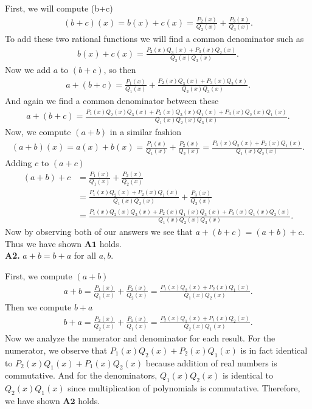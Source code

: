 \documentclass [10pt]{article}
\begin{document}
\begin{enumerate}
\begin{enumerate}
{First, we will compute (b+c) 
\begin{align*}
    (b+c)(x) = b(x) + c(x) = \frac{P_2(x)}{Q_2(x)} + \frac{P_3(x)}{Q_3(x)}.
\end{align*}
To add these two rational functions we will find a common denominator such as 
\begin{align*}
    b(x) + c(x) = \frac{P_2(x) Q_3(x) + P_3(x) Q_2(x)}{Q_2(x) Q_3(x)}.
\end{align*}
Now we add $a$ to $(b + c)$, so then
\begin{align*}
    a + (b+c) = \frac{P_1(x)}{Q_1(x)} + \frac{P_2(x) Q_3(x) + P_3(x) Q_2(x)}{Q_2(x) Q_3(x)}.
\end{align*}
And again we find a common denominator between these 
\begin{align*}
    a+(b+c) = \frac{P_1(x) Q_2(x) Q_3(x) + P_2(x) Q_3(x) Q_1(x) + P_3(x) Q_2(x) Q_1(x)}{ Q_1(x) Q_2(x) Q_3(x)}.
\end{align*}
Now, we compute $(a+b)$ in a similar fashion 
\begin{align*}
    (a+b)(x) = a(x) + b(x) = \frac{P_1(x)}{Q_1(x)} + \frac{P_2(x)}{Q_2(x)} = \frac{P_1(x) Q_2(x) + P_2(x) Q_1(x)}{Q_1(x) Q_2(x)}.
\end{align*}
Adding $c$ to $(a+c)$ 
\begin{align*}
    (a+b) + c 
    &= \frac{P_1(x)}{Q_1(x)} + \frac{P_2(x)}{Q_2(x)} \\
    &= \frac{P_1(x) Q_2(x) + P_2(x) Q_1(x)}{Q_1(x) Q_2(x)} + \frac{P_3(x)}{Q_3(x)} \\
    &= \frac{P_1(x) Q_2(x) Q_3(x) + P_2(x) Q_1(x) Q_3(x) + P_3(x) Q_1(x) Q_2(x)}{Q_1(x) Q_2(x) Q_3(x)}.
\end{align*}
Now by observing both of our answers we see that $a + (b+c) = (a+b) + c$. Thus we have shown $\textbf{A1}$ holds. \\

\textbf{A2.} $a + b = b + a$ for all $a,b$. 

First, we compute $(a+b)$ 
\begin{align*}
    a + b = \frac{P_1(x)}{Q_1(x)} + \frac{P_2(x)}{Q_2(x)} = \frac{P_1(x) Q_2(x) + P_2(x) Q_1(x)}{Q_1(x) Q_2(x)}.
\end{align*}
Then we compute $b + a$ 
\begin{align*}
    b + a = \frac{P_2(x)}{Q_2(x)} + \frac{P_1(x)}{Q_1(x)} = \frac{P_2(x) Q_1(x) + P_1(x) Q_2(x)}{Q_2(x) Q_1(x)}. 
\end{align*}
Now we analyze the numerator and denominator for each result. For the numerator, we observe that $P_1(x) Q_2(x) + P_2(x) Q_1(x)$ is in fact identical to $P_2(x) Q_1(x) + P_1(x) Q_2(x)$ because addition of real numbers is commutative. And for the denominators, $Q_1(x) Q_2(x)$ is identical to $Q_2(x) Q_1(x)$ since multiplication of polynomials is commutative. Therefore, we have shown $\textbf{A2}$ holds. \\

}
\end{enumerate}
\end{enumerate}
\end{document}

